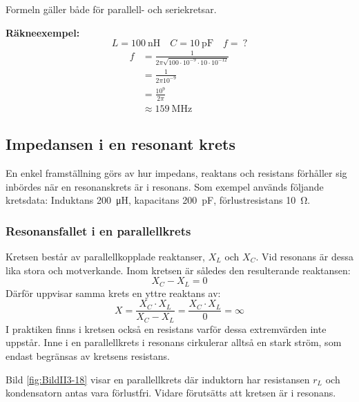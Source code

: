 Formeln gäller både för parallell- och seriekretsar.

\vspace*{1ex}
\noindent
\textbf{Räkneexempel:}
%
\[L = \SI{100}{\nano\henry} \quad C = \SI{10}{\pico\farad} \quad f =\ ?\]
\begin{align*}
  f &= \frac{1}{2\pi \sqrt{100 \cdot 10^{-9} \cdot 10 \cdot 10^{-12}}} \\
  &= \frac{1}{2\pi 10^{-9}} \\
  &= \frac{10^9}{2\pi } \\
  &\approx \SI{159}{\mega\hertz}
\end{align*}

\subsection{Impedansen i en resonant krets}
\label{impedans_resonant_krets}


En enkel framställning görs av hur impedans, reaktans och resistans förhåller
sig inbördes när en resonanskrets är i resonans.
Som exempel används följande kretsdata: Induktans \SI{200}{\micro\henry},
kapacitans \SI{200}{\pico\farad}, förlustresistans \SI{10}{\ohm}.

\subsubsection{Resonansfallet i en parallellkrets}
\label{parallellresonans}


Kretsen består av parallellkopplade reaktanser, \(X_L\) och \(X_C\).
Vid resonans är dessa lika stora och motverkande.
Inom kretsen är således den resulterande reaktansen:
%
\[X_C - X_L = 0\]
%
Därför uppvisar samma krets en yttre reaktans av:
%
\[
  X = \frac{X_C \cdot X_L}{X_C - X_L}
  = \frac{X_C \cdot X_L}{0}
  = \infty
\]
%
I praktiken finns i kretsen också en resistans varför dessa extremvärden inte
uppstår.
Inne i en parallellkrets i resonans cirkulerar alltså en stark ström,
som endast begränsas av kretsens resistans.

Bild \ref{fig:BildII3-18} visar en parallellkrets där induktorn har resistansen
\(r_L\) och kondensatorn antas vara förlustfri.
Vidare förutsätts att kretsen är i resonans.

